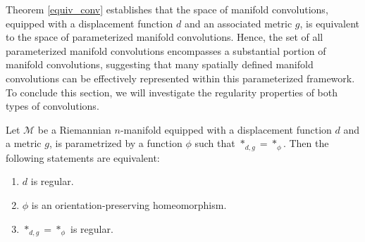 
Theorem \ref{equiv_conv} establishes that the space of manifold convolutions, equipped with a displacement function $d$ and an associated metric $g$, is equivalent to the space of parameterized manifold convolutions. Hence, the set of all parameterized manifold convolutions encompasses a substantial portion of manifold convolutions, suggesting that many spatially defined manifold convolutions can be effectively represented within this parameterized framework. To conclude this section, we will investigate the regularity properties of both types of convolutions.



\begin{corollary}
    Let $\mathcal{M}$ be a Riemannian $n$-manifold equipped with a displacement function $d$ and a metric $g$, is parametrized by a function $\phi$ such that $*_{d,g} = *_\phi$. Then the following statements are equivalent:
    \begin{enumerate}
        \item $d$ is regular.
        \item $\phi$ is an orientation-preserving homeomorphism.
        \item $*_{d,g} = *_\phi$ is regular.
    \end{enumerate}
    \label{them:manifoldparametrized}
\end{corollary}

